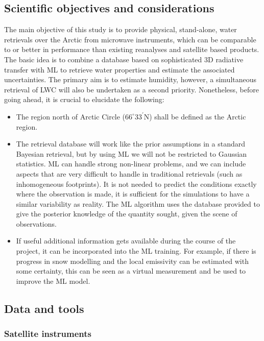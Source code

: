 \documentclass[12pt,oneside,a4paper]{article}
\begin{document}
\subsection{Scientific objectives and considerations}
The main objective of this study is to provide physical, stand-alone, water retrievals over the Arctic from microwave instruments, which can be comparable to or better in performance than existing reanalyses and satellite based products. The basic idea is to combine a database based on sophisticated 3D radiative transfer with ML to retrieve water properties and estimate the associated uncertainties. The primary aim is to estimate humidity, however, a simultaneous retrieval of LWC will also be undertaken as a second priority. Nonetheless, before going ahead, it is crucial to elucidate the following:
\begin{itemize}
\item The region north of Arctic Circle ($66^{\circ}33^{'}$N) shall be defined as the Arctic region.	
\item The retrieval database will work like the prior assumptions in a standard   Bayesian retrieval, but by using ML we will not be restricted to Gaussian statistics. ML can handle strong non-linear problems, and we can include   aspects that are very difficult to handle in traditional retrievals (such as  inhomogeneous footprints). It is not needed to predict the conditions exactly where the observation is made, it is sufficient for the simulations to have a   similar variability as reality. The ML algorithm uses the database provided to give the posterior knowledge of the quantity sought, given the scene of observations.
\item If useful additional information gets available during the course of the   project, it can be incorporated into the ML training. For example, if there is progress in snow modelling and the local emissivity can be estimated with  some certainty, this can be seen as a virtual measurement and be used to improve the ML model.
\end{itemize}

\subsection{Data and tools}
% 
\subsubsection{Satellite instruments}
\end{document}
